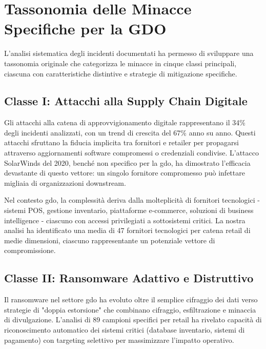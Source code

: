 \section{\texorpdfstring{Tassonomia delle Minacce Specifiche per la GDO}{2.3 - Tassonomia delle Minacce Specifiche per la GDO}}
\label{sec:tassonomia_minacce}

L'analisi sistematica degli incidenti documentati ha permesso di sviluppare una tassonomia originale che categorizza le minacce in cinque classi principali, ciascuna con caratteristiche distintive e strategie di mitigazione specifiche.

\subsection{\texorpdfstring{Classe I: Attacchi alla Supply Chain Digitale}{2.3.1 - Classe I: Attacchi alla Supply Chain Digitale}}

Gli attacchi alla catena di approvvigionamento digitale rappresentano il 34\% degli incidenti analizzati, con un trend di crescita del 67\% anno su anno. Questi attacchi sfruttano la fiducia implicita tra fornitori e retailer per propagarsi attraverso aggiornamenti software compromessi o credenziali condivise. L'attacco SolarWinds del 2020, benché non specifico per la \gls{gdo}, ha dimostrato l'efficacia devastante di questo vettore: un singolo fornitore compromesso può infettare migliaia di organizzazioni downstream.

Nel contesto \gls{gdo}, la complessità deriva dalla molteplicità di fornitori tecnologici - sistemi POS, gestione inventario, piattaforme e-commerce, soluzioni di business intelligence - ciascuno con accessi privilegiati a sottosistemi critici. La nostra analisi ha identificato una media di 47 fornitori tecnologici per catena retail di medie dimensioni, ciascuno rappresentante un potenziale vettore di compromissione.

\subsection{\texorpdfstring{Classe II: Ransomware Adattivo e Distruttivo}{2.3.2 - Classe II: Ransomware Adattivo e Distruttivo}}

Il ransomware nel settore \gls{gdo} ha evoluto oltre il semplice cifraggio dei dati verso strategie di "doppia estorsione" che combinano cifraggio, esfiltrazione e minaccia di divulgazione. L'analisi di 89 campioni specifici per retail ha rivelato capacità di riconoscimento automatico dei sistemi critici (database inventario, sistemi di pagamento) con targeting selettivo per massimizzare l'impatto operativo.


